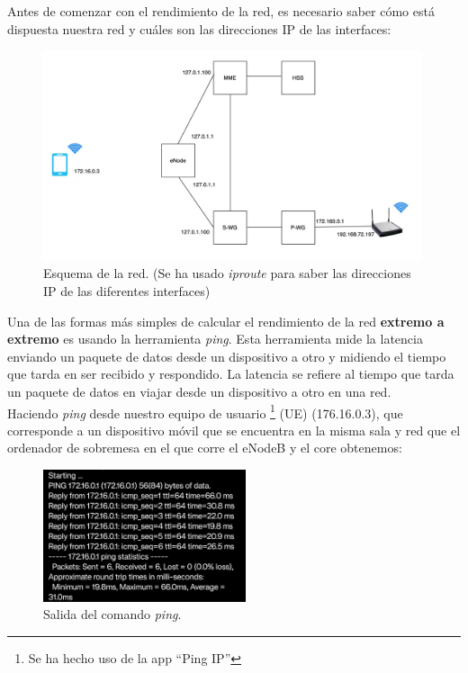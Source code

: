 Antes de comenzar con el rendimiento de la red, es necesario saber cómo está dispuesta nuestra red y cuáles son las direcciones IP de las interfaces:

\begin{figure}[H]
    \centering
    \includegraphics[width=0.99\textwidth]{Imagenes/Rendimiento/red.jpeg}
    \caption{Esquema de la red. (Se ha usado \textit{iproute} para saber las direcciones IP de las diferentes interfaces)}
    \label{fig:EsquemaRed}
\end{figure}

Una de las formas más simples de calcular el rendimiento de la red \textbf{extremo a extremo} es usando la herramienta \textit{ping}. Esta herramienta mide la latencia enviando un paquete de datos desde un dispositivo a otro y midiendo el tiempo que tarda en ser recibido y respondido. La latencia se refiere al tiempo que tarda un paquete de datos en viajar desde un dispositivo a otro en una red.\\
Haciendo \textit{ping} desde nuestro equipo de usuario \footnote{Se ha hecho uso de la app “Ping IP”} (UE) (176.16.0.3), que corresponde a un dispositivo móvil  que se encuentra en la misma sala y red que el ordenador de sobremesa en el que corre el eNodeB y el core obtenemos: 

 \begin{figure}[H]
    \centering
    \includegraphics[width=0.53\textwidth]{Imagenes/Rendimiento/ping.jpeg}
    \caption{Salida del comando \textit{ping}.}
    \label{fig:ping}
\end{figure}

